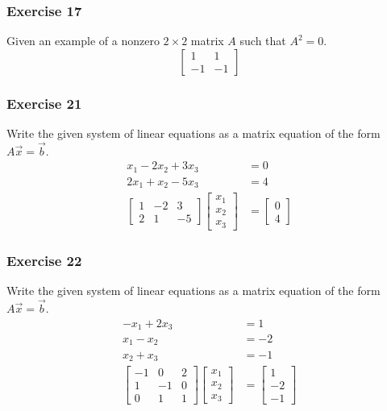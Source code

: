 \documentclass[letterpaper, 12pt]{math}
\begin{document}
\subsubsection*{Exercise 17}
Given an example of a nonzero \( 2\times2 \) matrix \( A \) such that
\( A^2 = 0 \).
\[ \begin{bmatrix}1 & 1 \\ -1 & -1\end{bmatrix} \]

\subsubsection*{Exercise 21}
Write the given system of linear equations as a matrix equation of the form
\( A\vec{x} = \vec{b} \).
\begin{align*}
  x_1-2x_2+3x_3 &= 0 \\
  2x_1+x_2-5x_3 &= 4 \\
  \begin{bmatrix}
    1 & -2 & 3 \\
    2 & 1 & -5
  \end{bmatrix}\begin{bmatrix}
    x_1 \\ x_2 \\ x_3
  \end{bmatrix} &= \begin{bmatrix}
    0 \\ 4
  \end{bmatrix}
\end{align*}

\subsubsection*{Exercise 22}
Write the given system of linear equations as a matrix equation of the form
\( A\vec{x} = \vec{b} \).
\begin{align*}
  -x_1 + 2x_3 &= 1 \\
  x_1-x_2 &= -2 \\
  x_2+x_3 &= -1 \\
  \begin{bmatrix}
    -1 & 0 & 2 \\
    1 & -1 & 0 \\
    0 & 1 & 1
  \end{bmatrix}\begin{bmatrix}
    x_1 \\ x_2 \\ x_3
  \end{bmatrix} &= \begin{bmatrix}
    1 \\ -2 \\ -1
  \end{bmatrix}
\end{align*}
\end{document}
